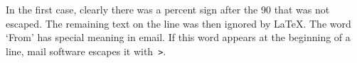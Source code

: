 In the first case, clearly there was a percent sign after the 90 that
was not escaped. The remaining text on the line was then ignored by
\LaTeX.
The word `From' has special meaning in email. If this word appears at
the beginning of a line, mail software escapes it with~\verb+>+.
